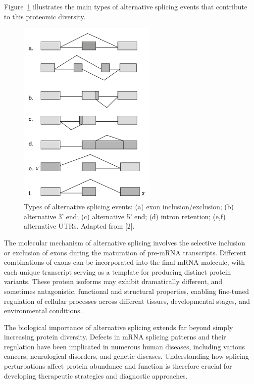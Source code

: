 \documentclass[12pt,a4paper]{article}
\begin{document}
Figure~\ref{fig:alt_splicing_types} illustrates the main types of alternative splicing events that contribute to this proteomic diversity.

\begin{figure}[H]
\centering
\includegraphics[width=0.6\textwidth]{images/alt_splicing_figure_1_florea.png}
\caption{Types of alternative splicing events: (a) exon inclusion/exclusion; (b) alternative 3' end; (c) alternative 5' end; (d) intron retention; (e,f) alternative UTRs. Adapted from [2].}
\label{fig:alt_splicing_types}
\end{figure}

The molecular mechanism of alternative splicing involves the selective inclusion or exclusion of exons during the maturation of pre-mRNA transcripts. Different combinations of exons can be incorporated into the final mRNA molecule, with each unique transcript serving as a template for producing distinct protein variants. These protein isoforms may exhibit dramatically different, and sometimes antagonistic, functional and structural properties, enabling fine-tuned regulation of cellular processes across different tissues, developmental stages, and environmental conditions.

The biological importance of alternative splicing extends far beyond simply increasing protein diversity. Defects in mRNA splicing patterns and their regulation have been implicated in numerous human diseases, including various cancers, neurological disorders, and genetic diseases. Understanding how splicing perturbations affect protein abundance and function is therefore crucial for developing therapeutic strategies and diagnostic approaches.
\end{document}
